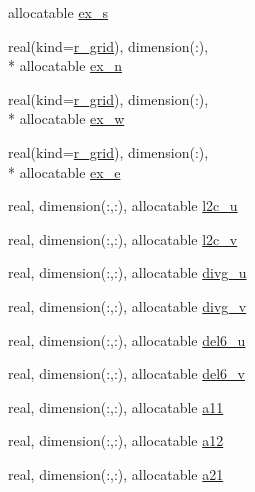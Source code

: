 \begin{DoxyCompactItemize}
allocatable \hyperlink{structfv__arrays__mod_1_1fv__grid__type_a6b7012fcbcb22a5cc14c9be2485a3c41}{ex\-\_\-s}
\item 
real(kind=\hyperlink{classfv__arrays__mod_ab0ba8527d270f349a84fa0a330be1923}{r\-\_\-grid}), dimension(\-:), \\*
allocatable \hyperlink{structfv__arrays__mod_1_1fv__grid__type_a663a182c460c4b7efcebf76b5c925fcc}{ex\-\_\-n}
\item 
real(kind=\hyperlink{classfv__arrays__mod_ab0ba8527d270f349a84fa0a330be1923}{r\-\_\-grid}), dimension(\-:), \\*
allocatable \hyperlink{structfv__arrays__mod_1_1fv__grid__type_a4f73ad5d1c32bde5cc53efca1c1df17f}{ex\-\_\-w}
\item 
real(kind=\hyperlink{classfv__arrays__mod_ab0ba8527d270f349a84fa0a330be1923}{r\-\_\-grid}), dimension(\-:), \\*
allocatable \hyperlink{structfv__arrays__mod_1_1fv__grid__type_a345df2e66abf34e78c67bf5f0fd637ed}{ex\-\_\-e}
\item 
real, dimension(\-:,\-:), allocatable \hyperlink{structfv__arrays__mod_1_1fv__grid__type_a55a06e29892a5836e8b5fc3822fa51e9}{l2c\-\_\-u}
\item 
real, dimension(\-:,\-:), allocatable \hyperlink{structfv__arrays__mod_1_1fv__grid__type_ab9c256610f44e1b093ece9c0c336e810}{l2c\-\_\-v}
\item 
real, dimension(\-:,\-:), allocatable \hyperlink{structfv__arrays__mod_1_1fv__grid__type_a23614cd19fe0fe1b9d1c94fdc87eace8}{divg\-\_\-u}
\item 
real, dimension(\-:,\-:), allocatable \hyperlink{structfv__arrays__mod_1_1fv__grid__type_a3203d6edb0bb98b83aca50bfea929e42}{divg\-\_\-v}
\item 
real, dimension(\-:,\-:), allocatable \hyperlink{structfv__arrays__mod_1_1fv__grid__type_a0a50635625e1283ae8921ef1606b770d}{del6\-\_\-u}
\item 
real, dimension(\-:,\-:), allocatable \hyperlink{structfv__arrays__mod_1_1fv__grid__type_af4578e602380c414292d93203313aaa3}{del6\-\_\-v}
\item 
real, dimension(\-:,\-:), allocatable \hyperlink{structfv__arrays__mod_1_1fv__grid__type_a031ca03cf75ef158170a02c92e33b712}{a11}
\item 
real, dimension(\-:,\-:), allocatable \hyperlink{structfv__arrays__mod_1_1fv__grid__type_aff9b4a668b6765383d5750a0244f1f29}{a12}
\item 
real, dimension(\-:,\-:), allocatable \hyperlink{structfv__arrays__mod_1_1fv__grid__type_a231230cb675e894522f263d9bc28e64b}{a21}

\end{DoxyCompactItemize}

